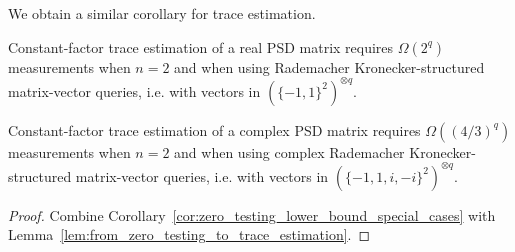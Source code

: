 We obtain a similar corollary for trace estimation.
\begin{corollary}
\label{cor:trace_estimation_lower_bound}
Constant-factor trace estimation of a real PSD matrix requires $\Omega(2^{q})$ measurements when \(n=2\) and when using Rademacher Kronecker-structured matrix-vector queries, i.e. with vectors in $(\{-1,1\}^2)^{\otimes q}.$

Constant-factor trace estimation of a complex PSD matrix requires $\Omega((4/3)^{q})$ measurements when \(n=2\) and when using complex Rademacher Kronecker-structured matrix-vector queries, i.e. with vectors in $(\{-1,1,i,-i\}^2)^{\otimes q}.$
\end{corollary}

\begin{proof}
Combine Corollary~\ref{cor:zero_testing_lower_bound_special_cases} with Lemma~\ref{lem:from_zero_testing_to_trace_estimation}.
\end{proof}







\iffalse
\begin{theorem}
Let $\mathcal{A}\subseteq\R$ be an fixed alphabet of size $\abs{\mathcal{A}} = L.$  A zero-testing algorithm that makes Kronecker structured measurements using entries from $\mathcal{A}$ requires at least FILL measurements.  Moreover there are algorithms using FILL measurements.
\end{theorem}
\begin{proof}

For the lower bound, let $x\in\R^n$ have two coordinates of opposite signs in uniformly random pair of positions $(i,j)$.  Suppose that $v$ has entries drawn from $\mathcal{A}.$  Then $\inner{v}{x} = 0$ precisely when $v_i = v_j$.

Suppose that $v$ has $n_k$ entries from value $k$ in $\mathcal{A}.$ The probability that $v_i = v_j$ is then
\[
\dbinom{n}{2}^{-1}\left(\dbinom{n_1}{2} + \dbinom{n_2}{2} + \ldots + \dbinom{n_L}{2}\right).
\]
We can bound this sum as
\[
\sum_{i=1}^L \dbinom{n_i}{2} 
= \frac{1}{2}\sum_{i=1}^L (n_i^2 - n_i)
= \frac{1}{2}(\sum_{i=1}^L n_i^2 - n)
\geq \frac{1}{2}(\frac{n^2}{L} - n).
\]
It follows that
\[
\Pr(v_i = v_j) \geq \frac{1}{L}\frac{n-L}{n-1}.
\]
This in turn implies that 
\[\inner{v^{(1)} \otimes \ldots \otimes v^{(q)}}{x^{(1)} \otimes \ldots \otimes x^{(q)}} \neq 0
\] with probability at most $\left(1 - \frac{1}{L}\frac{n-L}{n-1}\right)^q.$


\end{proof}

\Raph{Todo: add corollary for trace est, one in large alphabet in in small alphabet (for both real and complex)}

\fi

